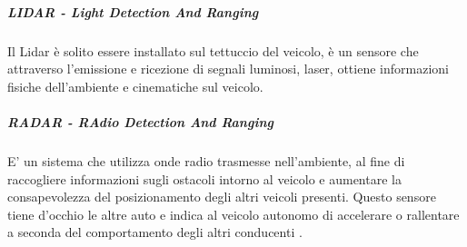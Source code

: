 \documentclass[14pt]{extarticle}
\begin{document}
\subparagraph{LIDAR - Light Detection And Ranging}
Il Lidar è  solito essere installato sul tettuccio del veicolo, è un sensore che attraverso l'emissione e ricezione di segnali luminosi, laser, ottiene informazioni fisiche  dell'ambiente e  cinematiche sul  veicolo.

\subparagraph{RADAR - RAdio Detection And Ranging}
E' un sistema che utilizza onde radio trasmesse nell'ambiente, al fine di raccogliere informazioni sugli  ostacoli intorno al veicolo e aumentare la consapevolezza del  posizionamento degli altri veicoli presenti. Questo sensore tiene
d’occhio le altre auto e indica al veicolo autonomo di accelerare o rallentare
a seconda del comportamento degli altri conducenti \cite{das2018risk}.
\end{document}
